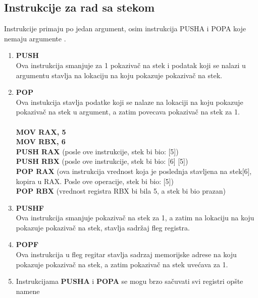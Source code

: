 \documentclass[a4paper]{article}
\begin{document}
\subsection{\textbf{Instrukcije za rad sa stekom}}
Instrukcije primaju po jedan argument, osim instrukcija PUSHA i POPA koje nemaju argumente \cite{x86Assembly}.
\begin{enumerate}
\item{\textbf{PUSH}}\\
	Ova instrukcija smanjuje za 1 pokaziva\v c na stek i podatak koji se nalazi u argumentu stavlja na lokaciju na koju pokazuje pokaziva\v c na stek.
\item{\textbf{POP}}\\
	Ova instukcija stavlja podatke koji se nalaze na lokaciji na koju pokazuje pokaziva\v c na stek u argument, a zatim povecava pokaziva\v c na stek za 1.\\ \\
	\textbf{MOV RAX, 5}\\
	\textbf{MOV RBX, 6}\\
	\textbf{PUSH RAX} (posle ove instrukcije, stek bi bio: [5])\\    
	\textbf{PUSH RBX} (posle ove instrukcije, stek bi bio: [6] [5])\\
	\textbf{POP RAX}  (ova instrukcija vrednost koja je poslednja stavljena na stek[6], kopira u RAX. Posle ove operacije, stek bi bio: [5])\\
	\textbf{POP RBX} (vrednost registra RBX bi bila 5, a stek bi bio prazan)\\
\item{\textbf{PUSHF}}\\
	Ova instrukcija smanjuje pokaziva\v c na stek za 1, a zatim na lokaciju na koju pokazuje pokaziva\v c na stek, stavlja sadr\v zaj fleg registra.
\item{\textbf{POPF}}\\
	Ova instrukcija u fleg regitar stavlja sadrzaj memorijske adrese na koju pokazuje pokaziva\v c na stek, a zatim pokaziva\v c na stek uve\' cava za 1.
\item {Instrukcijama \textbf{PUSHA} i \textbf{POPA} se mogu brzo sa\v cuvati svi registri op\v ste namene}

\end{enumerate}


\end{document}
